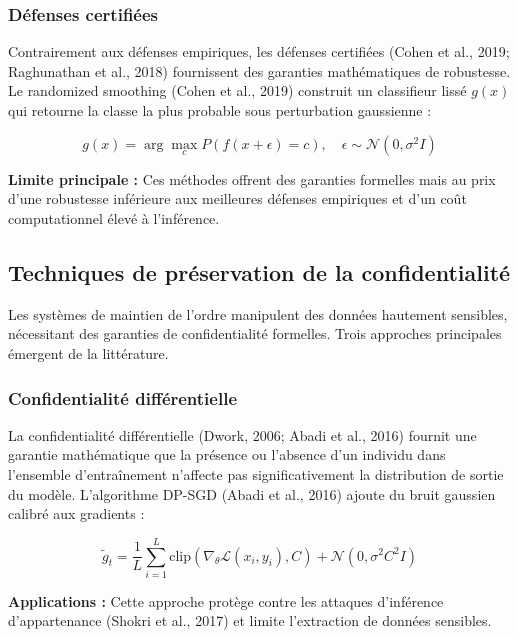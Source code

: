 \subsubsection{Défenses certifiées}

Contrairement aux défenses empiriques, les défenses certifiées (Cohen et al., 2019; Raghunathan et al., 2018) fournissent des garanties mathématiques de robustesse. Le randomized smoothing (Cohen et al., 2019) construit un classifieur lissé $g(x)$ qui retourne la classe la plus probable sous perturbation gaussienne :

\begin{equation}
g(x) = \arg\max_c P(f(x + \epsilon) = c), \quad \epsilon \sim \mathcal{N}(0, \sigma^2 I)
\end{equation}

\textbf{Limite principale :} Ces méthodes offrent des garanties formelles mais au prix d'une robustesse inférieure aux meilleures défenses empiriques et d'un coût computationnel élevé à l'inférence.

\subsection{Techniques de préservation de la confidentialité}
\label{subsec:confidentialite}

Les systèmes de maintien de l'ordre manipulent des données hautement sensibles, nécessitant des garanties de confidentialité formelles. Trois approches principales émergent de la littérature.

\subsubsection{Confidentialité différentielle}

La confidentialité différentielle (Dwork, 2006; Abadi et al., 2016) fournit une garantie mathématique que la présence ou l'absence d'un individu dans l'ensemble d'entraînement n'affecte pas significativement la distribution de sortie du modèle. L'algorithme DP-SGD (Abadi et al., 2016) ajoute du bruit gaussien calibré aux gradients :

\begin{equation}
\tilde{g}_t = \frac{1}{L} \sum_{i=1}^{L} \text{clip}(\nabla_\theta \mathcal{L}(x_i, y_i), C) + \mathcal{N}(0, \sigma^2 C^2 I)
\end{equation}

\textbf{Applications :} Cette approche protège contre les attaques d'inférence d'appartenance (Shokri et al., 2017) et limite l'extraction de données sensibles.

